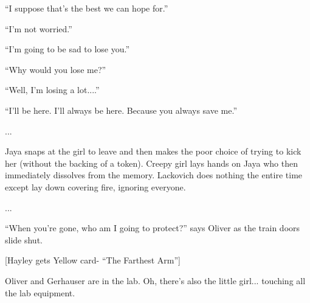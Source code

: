 ``I suppose that's the best we can hope for.''

``I'm not worried.''

``I'm going to be sad to lose you.''

``Why would you lose me?''

``Well, I'm losing a lot....''

``I'll be here.  I'll always be here.  Because you always save me.''

...

Jaya snaps at the girl to leave and then makes the poor choice of trying to kick her (without the backing of a token).  Creepy girl lays hands on Jaya who then immediately dissolves from the memory.   Lackovich does nothing the entire time except lay down covering fire, ignoring everyone. 

...

``When you're gone, who am I going to protect?'' says Oliver as the train doors slide shut.



{[}Hayley gets Yellow card- ``The Farthest Arm''{]}






Oliver and Gerhauser are in the lab.  Oh, there's also the little girl... touching all the lab equipment. 


